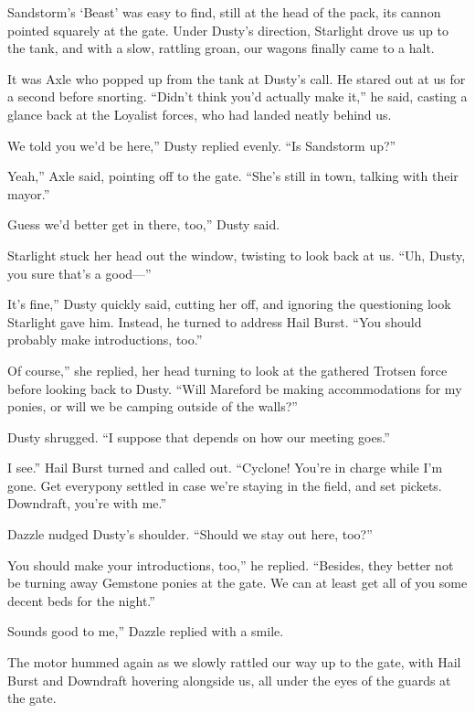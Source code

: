 Sandstorm’s ‘Beast’ was easy to find, still at the head of the pack, its cannon pointed squarely at the gate. Under Dusty’s direction, Starlight drove us up to the tank, and with a slow, rattling groan, our wagons finally came to a halt.

It was Axle who popped up from the tank at Dusty’s call. He stared out at us for a second before snorting. “Didn’t think you’d actually make it,” he said, casting a glance back at the Loyalist forces, who had landed neatly behind us.

\leavevmode{}We told you we’d be here,” Dusty replied evenly. “Is Sandstorm up?”

\leavevmode{}Yeah,” Axle said, pointing off to the gate. “She’s still in town, talking with their mayor.”

\leavevmode{}Guess we’d better get in there, too,” Dusty said.

Starlight stuck her head out the window, twisting to look back at us. “Uh, Dusty, you sure that’s a good—”

\leavevmode{}It’s fine,” Dusty quickly said, cutting her off, and ignoring the questioning look Starlight gave him. Instead, he turned to address Hail Burst. “You should probably make introductions, too.”

\leavevmode{}Of course,” she replied, her head turning to look at the gathered Trotsen force before looking back to Dusty. “Will Mareford be making accommodations for my ponies, or will we be camping outside of the walls?”

Dusty shrugged. “I suppose that depends on how our meeting goes.”

\leavevmode{}I see.” Hail Burst turned and called out. “Cyclone! You’re in charge while I’m gone. Get everypony settled in case we’re staying in the field, and set pickets. Downdraft, you’re with me.”

Dazzle nudged Dusty’s shoulder. “Should we stay out here, too?”

\leavevmode{}You should make your introductions, too,” he replied. “Besides, they better not be turning away Gemstone ponies at the gate. We can at least get all of you some decent beds for the night.”

\leavevmode{}Sounds good to me,” Dazzle replied with a smile.

The motor hummed again as we slowly rattled our way up to the gate, with Hail Burst and Downdraft hovering alongside us, all under the eyes of the guards at the gate.

